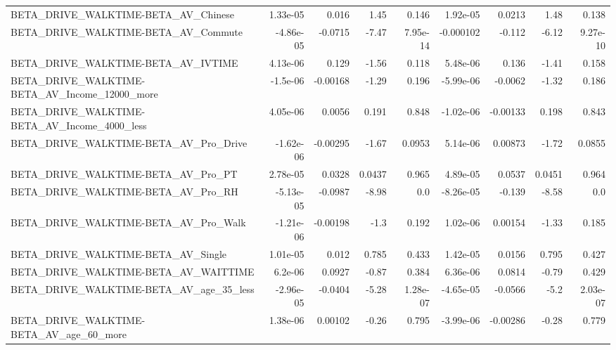 \begin{tabular}{lrrrrrrrr}
BETA\_DRIVE\_WALKTIME-BETA\_AV\_Chinese                &    1.33e-05 &        0.016 &      1.45 &    0.146 &   1.92e-05 &      0.0213 &         1.48 &         0.138 \\
BETA\_DRIVE\_WALKTIME-BETA\_AV\_Commute                &   -4.86e-05 &      -0.0715 &     -7.47 & 7.95e-14 &  -0.000102 &      -0.112 &        -6.12 &      9.27e-10 \\
BETA\_DRIVE\_WALKTIME-BETA\_AV\_IVTIME                 &    4.13e-06 &        0.129 &     -1.56 &    0.118 &   5.48e-06 &       0.136 &        -1.41 &         0.158 \\
BETA\_DRIVE\_WALKTIME-BETA\_AV\_Income\_12000\_more      &    -1.5e-06 &     -0.00168 &     -1.29 &    0.196 &  -5.99e-06 &     -0.0062 &        -1.32 &         0.186 \\
BETA\_DRIVE\_WALKTIME-BETA\_AV\_Income\_4000\_less       &    4.05e-06 &       0.0056 &     0.191 &    0.848 &  -1.02e-06 &    -0.00133 &        0.198 &         0.843 \\
BETA\_DRIVE\_WALKTIME-BETA\_AV\_Pro\_Drive              &   -1.62e-06 &     -0.00295 &     -1.67 &   0.0953 &   5.14e-06 &     0.00873 &        -1.72 &        0.0855 \\
BETA\_DRIVE\_WALKTIME-BETA\_AV\_Pro\_PT                 &    2.78e-05 &       0.0328 &    0.0437 &    0.965 &   4.89e-05 &      0.0537 &       0.0451 &         0.964 \\
BETA\_DRIVE\_WALKTIME-BETA\_AV\_Pro\_RH                 &   -5.13e-05 &      -0.0987 &     -8.98 &      0.0 &  -8.26e-05 &      -0.139 &        -8.58 &           0.0 \\
BETA\_DRIVE\_WALKTIME-BETA\_AV\_Pro\_Walk               &   -1.21e-06 &     -0.00198 &      -1.3 &    0.192 &   1.02e-06 &     0.00154 &        -1.33 &         0.185 \\
BETA\_DRIVE\_WALKTIME-BETA\_AV\_Single                 &    1.01e-05 &        0.012 &     0.785 &    0.433 &   1.42e-05 &      0.0156 &        0.795 &         0.427 \\
BETA\_DRIVE\_WALKTIME-BETA\_AV\_WAITTIME               &     6.2e-06 &       0.0927 &     -0.87 &    0.384 &   6.36e-06 &      0.0814 &        -0.79 &         0.429 \\
BETA\_DRIVE\_WALKTIME-BETA\_AV\_age\_35\_less            &   -2.96e-05 &      -0.0404 &     -5.28 & 1.28e-07 &  -4.65e-05 &     -0.0566 &         -5.2 &      2.03e-07 \\
BETA\_DRIVE\_WALKTIME-BETA\_AV\_age\_60\_more            &    1.38e-06 &      0.00102 &     -0.26 &    0.795 &  -3.99e-06 &    -0.00286 &        -0.28 &         0.779 \\

\end{tabular}

